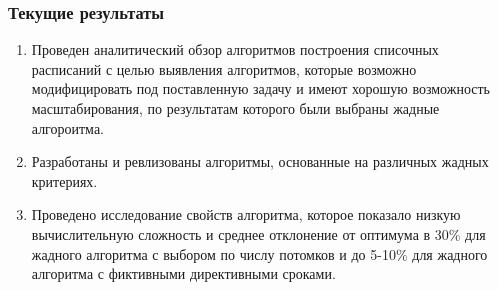 \begin{frame}
    \frametitle{Текущие результаты}
    \begin{enumerate}
        \item Проведен аналитический обзор алгоритмов построения списочных расписаний с целью выявления алгоритмов, которые возможно модифицировать под поставленную задачу и имеют хорошую возможность масштабирования, по результатам которого были выбраны жадные алгороитма.
        \item Разработаны и ревлизованы алгоритмы, основанные на различных жадных критериях.
        \item Проведено исследование свойств алгоритма, которое показало низкую вычислительную сложность и среднее отклонение от оптимума в 30\% для жадного алгоритма с выбором по числу потомков и до 5-10\% для жадного алгоритма с фиктивными директивными сроками. 
    \end{enumerate}
\end{frame}